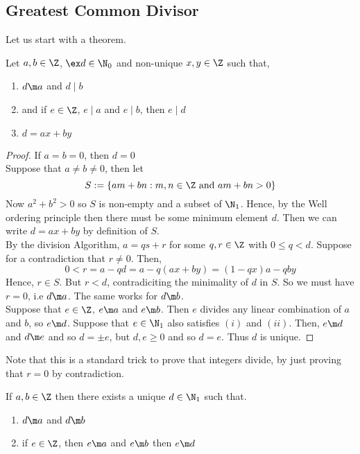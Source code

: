 \subsection{Greatest Common Divisor}
Let us start with a theorem.
\begin{nthm}
  Let $a, b \in \Z$, $\ex d \in \N_0$ and non-unique $x, y \in \Z$ such that,
  \begin{enumerate}
    \item $d \m a$ and $d \mid b$
    \item and if $e \in \Z$, $e \mid a$ and $e \mid b$, then $e \mid d$
    \item $d = ax + by$
  \end{enumerate}
\end{nthm}

\begin{proof}
  If $a = b = 0$, then $d = 0$\\
  Suppose that $a \ne b \ne 0$, then let
  $$ S := \{am + bn : m,n \in \Z \text{ and } am + bn > 0\} $$
  Now $a^2 + b^2 > 0$ so $S$ is non-empty and a subset of $\N_1$. Hence, by the Well ordering principle then there must be some minimum element $d$. Then we can write $d = ax + by$ by definition of $S$.\\

  \noindent
  By the division Algorithm, $a = qs + r$ for some $q, r \in \Z$ with $0 \le q  < d$. Suppose for a contradiction that $r \ne 0$. Then,
  $$ 0 < r = a - qd = a - q(ax + by) = (1- qx)a - qby $$
  Hence, $r \in S$. But $r < d$, contradiciting the minimality of $d$ in $S$. So we must have $r = 0$, i.e $d \m a$. The same works for $d \m b$.\\

  \noindent
  Suppose that $e \in \Z$, $e \m a$ and $e \m b$. Then $e$ divides any linear combination of $a$ and $b$, so $e \m d$. Suppose that $e \in \N_1$ also satisfies $(i)$ and $(ii)$. Then, $e \m d$ and $d \m e$ and so $d = \pm e$, but $d, e \ge 0$ and so $d = e$. Thus $d$ is unique.
\end{proof}

\noindent
Note that this is a standard trick to prove that integers divide, by just proving that $r = 0$ by contradiction.

\begin{ncor}
  If $a, b \in \Z$ then there exists a unique $d \in \N_1$ such that.
  \begin{enumerate}
    \item $d \m a$ and $d \m b$
    \item if $e \in \Z$, then $e \m a$ and $e \m b$ then $e \m d$
  \end{enumerate}
\end{ncor}

